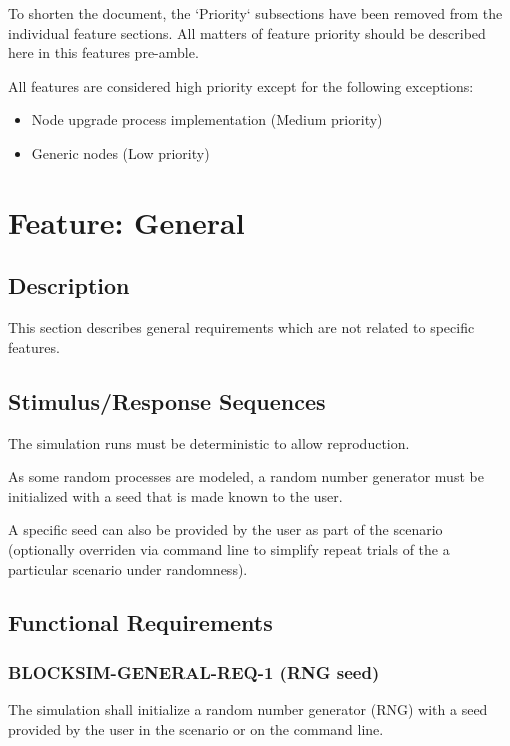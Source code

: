 \documentclass{scrreprt}
\begin{document}
  To shorten the document, the `Priority` subsections have been removed
  from the individual feature sections.  All matters of feature priority
  should be described here in this features pre-amble.

  All features are considered high priority except for the following
  exceptions:

  \begin{itemize}
    \item Node upgrade process implementation (Medium priority)
    \item Generic nodes (Low priority)
  \end{itemize}

  \section{Feature: General}

    \subsection{Description}

      This section describes general requirements which are not related to
      specific features.

    \subsection{Stimulus/Response Sequences}

      The simulation runs must be deterministic to allow reproduction.

      As some random processes are modeled, a random number generator must be
      initialized with a seed that is made known to the user.

      A specific seed can also be provided by the user as part of the scenario
      (optionally overriden via command line to simplify repeat trials of the
      a particular scenario under randomness).

    \subsection{Functional Requirements}

      \subsubsection{BLOCKSIM-GENERAL-REQ-1 (RNG seed)}

        The simulation shall initialize a random number generator (RNG)
        with a seed provided by the user in the scenario or on the command
        line.
\end{document}
